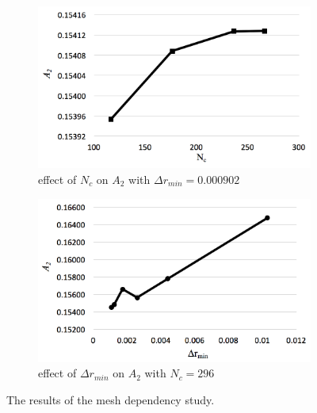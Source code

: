 \begin{figure}[tbh]	
	\newcommand\widthp{0.5}
	\centering
	\hspace*{\fill}%
	\begin{subfigure}[t]{\widthp\textwidth}
		\centering
		\includegraphics[width=\linewidth]{Figs/NcA2}
		\caption{effect of $ N_c $ on $ A_2 $ with $ \Delta r_{min} =0.000902$}
		\label{fig:nca2}
	\end{subfigure}%
	\begin{subfigure}[t]{\widthp\textwidth}
		\centering
		\includegraphics[width=\linewidth]{Figs/rminA2}
		\caption{effect of $ \Delta r_{min} $ on $ A_2 $ with $  N_c=296$}
		\label{fig:rmina2}
	\end{subfigure}%
	\caption{ The results of the mesh dependency study. 
	}
	\label{fig:meshindep}
\end{figure}



